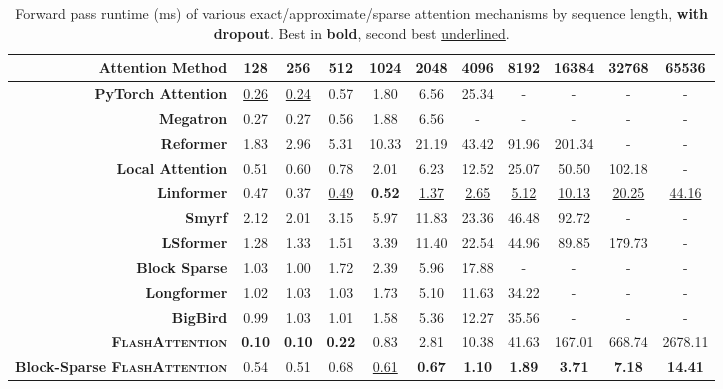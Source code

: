 \documentclass{article}
\newcommand{\sysname}{\textsc{FlashAttention}\xspace}
\begin{document}
\begin{table}
\centering
\scriptsize
\captionsetup{font=small}
\caption{Forward pass runtime (ms) of various exact/approximate/sparse attention mechanisms by sequence length, \textbf{with dropout}. Best in \textbf{bold}, second best \underline{underlined}.}
\begin{tabular}{@{}r|cccccccccc@{}}
\toprule
\textbf{Attention Method} & 128 & 256 & 512 & 1024 & 2048 & 4096 & 8192 & 16384 & 32768 & 65536 \\
\hline
\textbf{PyTorch Attention} & \underline{0.26} & \underline{0.24} & 0.57 & 1.80 & 6.56 & 25.34 & - & - & - & - \\
\textbf{Megatron} & 0.27 & 0.27 & 0.56 & 1.88 & 6.56 & - & - & - & - & - \\
\hline
\textbf{Reformer} & 1.83 & 2.96 & 5.31 & 10.33 & 21.19 & 43.42 & 91.96 & 201.34 & - & - \\
\textbf{Local Attention} & 0.51 & 0.60 & 0.78 & 2.01 & 6.23 & 12.52 & 25.07 & 50.50 & 102.18 & - \\
\textbf{Linformer} & 0.47 & 0.37 & \underline{0.49} & \textbf{0.52} & \underline{1.37} & \underline{2.65} & \underline{5.12} & \underline{10.13} & \underline{20.25} & \underline{44.16} \\
\textbf{Smyrf} & 2.12 & 2.01 & 3.15 & 5.97 & 11.83 & 23.36 & 46.48 & 92.72 & - & - \\
\textbf{LSformer} & 1.28 & 1.33 & 1.51 & 3.39 & 11.40 & 22.54 & 44.96 & 89.85 & 179.73 & - \\
\hline
\textbf{Block Sparse} & 1.03 & 1.00 & 1.72 & 2.39 & 5.96 & 17.88 & - & - & - & - \\
\textbf{Longformer} & 1.02 & 1.03 & 1.03 & 1.73 & 5.10 & 11.63 & 34.22 & - & - & - \\
\textbf{BigBird} & 0.99 & 1.03 & 1.01 & 1.58 & 5.36 & 12.27 & 35.56 & - & - & - \\
\hline
\textbf{\sysname} & \textbf{0.10} & \textbf{0.10} & \textbf{0.22} & 0.83 & 2.81 & 10.38 & 41.63 & 167.01 & 668.74 & 2678.11 \\
\textbf{Block-Sparse \sysname} & 0.54 & 0.51 & 0.68 & \underline{0.61} & \textbf{0.67} & \textbf{1.10} & \textbf{1.89} & \textbf{3.71} & \textbf{7.18} & \textbf{14.41} \\
\bottomrule
\end{tabular}
\label{tab:dropout_forward_pass}
\end{table}
\end{document}
